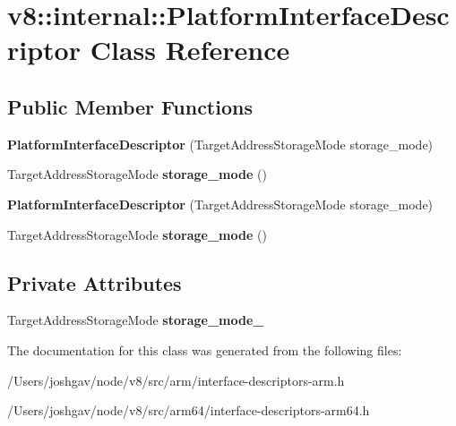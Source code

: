 \hypertarget{classv8_1_1internal_1_1_platform_interface_descriptor}{}\section{v8\+:\+:internal\+:\+:Platform\+Interface\+Descriptor Class Reference}
\label{classv8_1_1internal_1_1_platform_interface_descriptor}
\subsection*{Public Member Functions}
\begin{DoxyCompactItemize}
\item 
{\bfseries Platform\+Interface\+Descriptor} (Target\+Address\+Storage\+Mode storage\+\_\+mode)\hypertarget{classv8_1_1internal_1_1_platform_interface_descriptor_ac4156a9efd090b0e34e00cd41e619bd9}{}\label{classv8_1_1internal_1_1_platform_interface_descriptor_ac4156a9efd090b0e34e00cd41e619bd9}

\item 
Target\+Address\+Storage\+Mode {\bfseries storage\+\_\+mode} ()\hypertarget{classv8_1_1internal_1_1_platform_interface_descriptor_aa9ea45c95764a055d3c243fdbcf9c575}{}\label{classv8_1_1internal_1_1_platform_interface_descriptor_aa9ea45c95764a055d3c243fdbcf9c575}

\item 
{\bfseries Platform\+Interface\+Descriptor} (Target\+Address\+Storage\+Mode storage\+\_\+mode)\hypertarget{classv8_1_1internal_1_1_platform_interface_descriptor_ac4156a9efd090b0e34e00cd41e619bd9}{}\label{classv8_1_1internal_1_1_platform_interface_descriptor_ac4156a9efd090b0e34e00cd41e619bd9}

\item 
Target\+Address\+Storage\+Mode {\bfseries storage\+\_\+mode} ()\hypertarget{classv8_1_1internal_1_1_platform_interface_descriptor_aa9ea45c95764a055d3c243fdbcf9c575}{}\label{classv8_1_1internal_1_1_platform_interface_descriptor_aa9ea45c95764a055d3c243fdbcf9c575}

\end{DoxyCompactItemize}
\subsection*{Private Attributes}
\begin{DoxyCompactItemize}
\item 
Target\+Address\+Storage\+Mode {\bfseries storage\+\_\+mode\+\_\+}\hypertarget{classv8_1_1internal_1_1_platform_interface_descriptor_a057e1088ad3818d33cba2a1dd67a6e1a}{}\label{classv8_1_1internal_1_1_platform_interface_descriptor_a057e1088ad3818d33cba2a1dd67a6e1a}

\end{DoxyCompactItemize}


The documentation for this class was generated from the following files\+:\begin{DoxyCompactItemize}
\item 
/\+Users/joshgav/node/v8/src/arm/interface-\/descriptors-\/arm.\+h\item 
/\+Users/joshgav/node/v8/src/arm64/interface-\/descriptors-\/arm64.\+h\end{DoxyCompactItemize}
